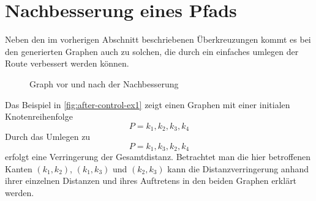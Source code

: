 \section{Nachbesserung eines Pfads}
Neben den im vorherigen Abschnitt beschriebenen Überkreuzungen kommt es bei den generierten Graphen auch zu solchen, die durch ein einfaches umlegen der Route verbessert werden können.

\begin{figure}[h]
    \begin{center}
    \caption{Graph vor und nach der Nachbesserung}
    \label{fig:after-control-ex1}
    \hfil
    \end{center}
\end{figure}

Das Beispiel in \vref{fig:after-control-ex1} zeigt einen Graphen mit einer initialen Knotenreihenfolge
$$P = k_1,k_2,k_3,k_4$$
Durch das Umlegen zu
$$P =k_1,k_3,k_2,k_4$$
erfolgt eine Verringerung der Gesamtdistanz.
Betrachtet man die hier betroffenen Kanten $(k_1,k_2)$, $(k_1,k_3)$ und $(k_2,k_3)$ kann die Distanzverringerung anhand ihrer einzelnen Distanzen und ihres Auftretens in den beiden Graphen erklärt werden.
